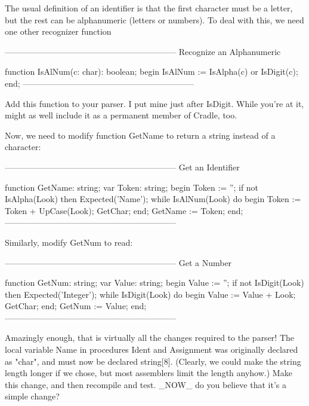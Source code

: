 \documentclass[float=false, crop=false]{standalone}
\begin{document}
The usual definition of an identifier is that the first character must be a
letter, but the rest can be alphanumeric (letters or numbers). To deal with
this, we need one other recognizer function

\begin{code}
{--------------------------------------------------------------}
{ Recognize an Alphanumeric }

function IsAlNum(c: char): boolean;
begin
   IsAlNum := IsAlpha(c) or IsDigit(c);
end;
{--------------------------------------------------------------}
\end{code}

Add this function to your parser. I put mine just after IsDigit. While you're at
it, might as well include it as a permanent member of Cradle, too.

Now, we need to modify function GetName to return a string instead of a
character:

\begin{code}
{--------------------------------------------------------------}
{ Get an Identifier }

function GetName: string;
var Token: string;
begin
   Token := '';
   if not IsAlpha(Look) then Expected('Name');
   while IsAlNum(Look) do begin
      Token := Token + UpCase(Look);
      GetChar;
   end;
   GetName := Token;
end;
{--------------------------------------------------------------}
\end{code}

Similarly, modify GetNum to read:

\begin{code}
{--------------------------------------------------------------}
{ Get a Number }

function GetNum: string;
var Value: string;
begin
   Value := '';
   if not IsDigit(Look) then Expected('Integer');
   while IsDigit(Look) do begin
      Value := Value + Look;
      GetChar;
   end;
   GetNum := Value;
end;
{--------------------------------------------------------------}
\end{code}

Amazingly enough, that is virtually all the changes required to the parser! The
local variable Name in procedures Ident and Assignment was originally declared
as "char", and must now be declared string[8]. (Clearly, we could make the
string length longer if we chose, but most assemblers limit the length anyhow.)
Make this change, and then recompile and test. _NOW_ do you believe that it's a
simple change?
\end{document}

